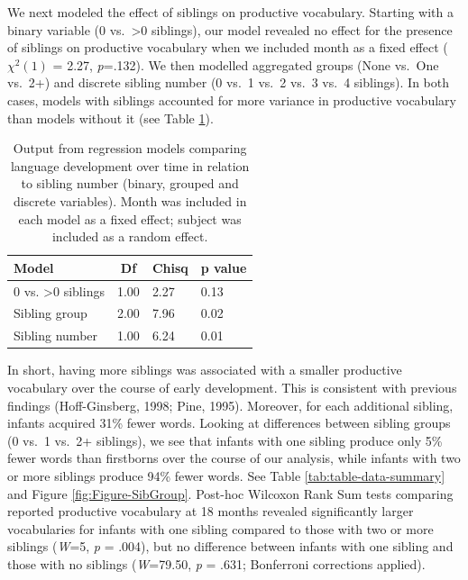\documentclass[
  english,
  man,floatsintext]{apa6}
\begin{document}
We next modeled the effect of siblings on productive vocabulary. Starting with a binary variable (0 vs.~\textgreater0 siblings), our model revealed no effect for the presence of siblings on productive vocabulary when we included month as a fixed effect (\(\chi^2 (1)\) = 2.27, \emph{p}=.132). We then modelled aggregated groups (None vs.~One vs.~2+) and discrete sibling number (0 vs.~1 vs.~2 vs.~3 vs.~4 siblings). In both cases, models with siblings accounted for more variance in productive vocabulary than models without it (see Table \ref{tab:table-sibling-model-output}).

\begin{table}[H]

\begin{center}
\begin{threeparttable}

\caption{\label{tab:table-sibling-model-output}Output from regression models comparing language development over time in relation to sibling number (binary, grouped and discrete variables). Month was included in each model as a fixed effect; subject was included as a random effect.}

\small{

\begin{tabular}{llll}
\toprule
Model & \multicolumn{1}{c}{Df} & \multicolumn{1}{c}{Chisq} & \multicolumn{1}{c}{p value}\\
\midrule
0 vs. >0 siblings & 1.00 & 2.27 & 0.13\\
Sibling group & 2.00 & 7.96 & 0.02\\
Sibling number & 1.00 & 6.24 & 0.01\\
\bottomrule
\end{tabular}

}

\end{threeparttable}
\end{center}

\end{table}

In short, having more siblings was associated with a smaller productive vocabulary over the course of early development. This is consistent with previous findings (Hoff-Ginsberg, 1998; Pine, 1995). Moreover, for each additional sibling, infants acquired 31\% fewer words. Looking at differences between sibling groups (0 vs.~1 vs.~2+ siblings), we see that infants with one sibling produce only 5\% fewer words than firstborns over the course of our analysis, while infants with two or more siblings produce 94\% fewer words. See Table \ref{tab:table-data-summary} and Figure \ref{fig:Figure-SibGroup}. Post-hoc Wilcoxon Rank Sum tests comparing reported productive vocabulary at 18 months revealed significantly larger vocabularies for infants with one sibling compared to those with two or more siblings (\emph{W}=5, \emph{p} = .004), but no difference between infants with one sibling and those with no siblings (\emph{W}=79.50, \emph{p} = .631; Bonferroni corrections applied).
\end{document}
